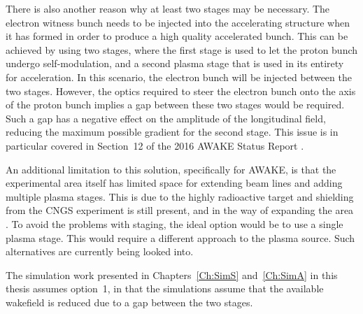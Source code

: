There is also another reason why at least two stages may be necessary.
The electron witness bunch needs to be injected into the accelerating structure when it has formed in order to produce a high quality accelerated bunch.
This can be achieved by using two stages, where the first stage is used to let the proton bunch undergo self-modulation, and a second plasma stage that is used in its entirety for acceleration.
In this scenario, the electron bunch will be injected between the two stages.
However, the optics required to steer the electron bunch onto the axis of the proton bunch implies a gap between these two stages would be required.
Such a gap has a negative effect on the amplitude of the longitudinal field, reducing the maximum possible gradient for the second stage.
This issue is in particular covered in Section~12 of the 2016 AWAKE Status Report \cite{awake_collaboration:2016}.

An additional limitation to this solution, specifically for AWAKE, is that the experimental area itself has limited space for extending beam lines and adding multiple plasma stages.
This is due to the highly radioactive target and shielding from the CNGS experiment is still present, and in the way of expanding the area \cite{adli:2016a}.
To avoid the problems with staging, the ideal option would be to use a single plasma stage.
This would require a different approach to the plasma source.
Such alternatives are currently being looked into.

The simulation work presented in Chapters~\ref{Ch:SimS} and~\ref{Ch:SimA} in this thesis assumes option~1, in that the simulations assume that the available wakefield is reduced due to a gap between the two stages.

